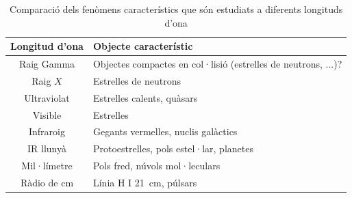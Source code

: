 \begin{table}[H]
	\centering
		\begin{tabularx}{0.9\textwidth}{cX}
		\toprule
		Longitud d'ona & Objecte característic \\
		\midrule
		Raig Gamma & Objectes compactes en col·lisió (estrelles de neutrons, ...)? \\
		Raig $X$ & Estrelles de neutrons \\
		Ultraviolat & Estrelles calents, quàsars \\
		Visible & Estrelles \\
		Infraroig & Gegants vermelles, nuclis galàctics \\
		IR llunyà & Protoestrelles, pols estel·lar, planetes \\
		Mil·límetre & Pols fred, núvols mol·leculars \\
		Ràdio de \si{\cm} & Línia H I \SI{21}{\cm}, púlsars \\
		\bottomrule
		\end{tabularx}
	\caption{Comparació dels fenòmens característics que són estudiats a diferents longituds d'ona}
	\label{tab:wavelenghts}
\end{table}
